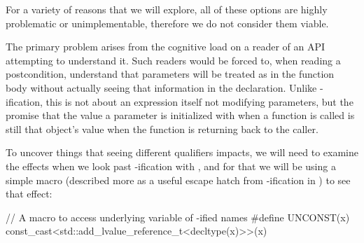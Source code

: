 For a variety of reasons that we will explore, all of these options are highly problematic or unimplementable, therefore we do not consider them viable.

The primary problem arises from the cognitive load on a reader of an API attempting to understand it.  Such readers would be forced to, when reading a postcondition, understand that parameters will be treated as  in the function body without actually seeing that information in the declaration.  Unlike -ification, this is not about an expression itself not modifying parameters, but the promise that the value a parameter is initialized with when a function is called is still that object's value when the function is returning back to the caller.

To uncover things that seeing different  qualifiers impacts, we will need to examine the effects when we look past -ification with , and for that we will be using a simple macro (described more as a useful escape hatch from -ification in \cite{P3261R1}) to see that effect:
\begin{codeblock}
// A macro to access underlying variable of -ified names
#define UNCONST(x) const_cast<std::add_lvalue_reference_t<decltype(x)>>(x)
\end{codeblock}

